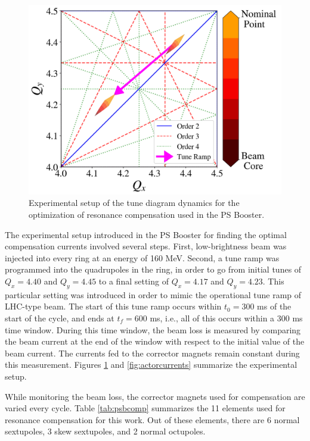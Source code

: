 \begin{figure}[H]
    \centering
    \includegraphics[width=\linewidth]{chapter5/experiment.png}
    \caption{Experimental setup of the tune diagram dynamics for the optimization of resonance compensation used in the PS Booster.}
    \label{fig:experimentPSB}
\end{figure}

The experimental setup introduced in the PS Booster for finding the optimal compensation currents involved several steps. First, low-brightness beam was injected into every ring at an energy of 160 MeV. Second, a tune ramp was programmed into the quadrupoles in the ring, in order to go from initial tunes of $Q_x = 4.40$ and $Q_y = 4.45$ to a final setting of $Q_x = 4.17$ and $Q_y = 4.23$. This particular setting was introduced in order to mimic the operational tune ramp of LHC-type beam. The start of this tune ramp occurs within $t_0 = 300$ ms of the start of the cycle, and ends at $t_f = 600$ ms, i.e., all of this occurs within a 300 ms time window. During this time window, the beam loss is measured by comparing the beam current at the end of the window with respect to the initial value of the beam current. The currents fed to the corrector magnets remain constant during this measurement. Figures \ref{fig:experimentPSB} and \ref{fig:actorcurrents} summarize the experimental setup. 

While monitoring the beam loss, the corrector magnets used for compensation are varied every cycle. Table \ref{tab:psbcomp} summarizes the 11 elements used for resonance compensation for this work. Out of these elements, there are 6 normal sextupoles, 3 skew sextupoles, and 2 normal octupoles. 

